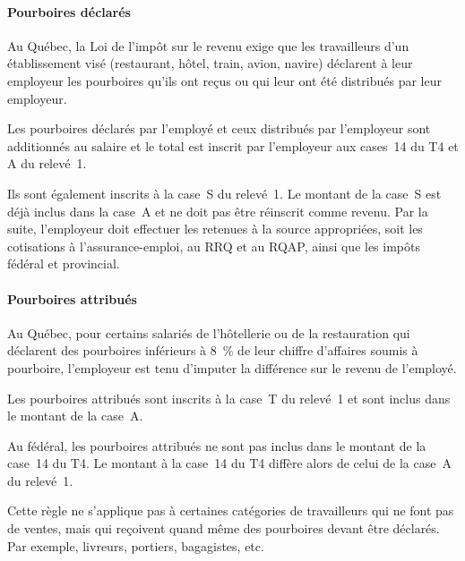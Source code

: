 \paragraph{Pourboires déclarés}
\qc
Au Québec, la Loi de l'impôt sur le revenu exige que les travailleurs d'un établissement visé (restaurant, hôtel, train, avion, navire) déclarent à leur employeur les pourboires qu'ils ont reçus ou qui leur ont été distribués par leur employeur.

Les pourboires déclarés par l'employé et ceux distribués par l'employeur sont additionnés au salaire et le total est inscrit par l'employeur aux cases~14 du T4 et A du relevé~1. 

Ils sont également inscrits à la case~S du relevé~1. Le montant de la case~S est déjà inclus dans la case~A et ne doit pas être réinscrit comme revenu. Par la suite, l'employeur doit effectuer les retenues à la source appropriées, soit les cotisations à l'assurance-emploi, au RRQ et au RQAP, ainsi que les impôts fédéral et provincial.

\paragraph{Pourboires attribués}

Au Québec, pour certains salariés de l'hôtellerie ou de la restauration qui déclarent des pourboires inférieurs à 8~\% de leur chiffre d'affaires soumis à pourboire, l'employeur est tenu d'imputer la différence sur le revenu de l'employé.

Les pourboires attribués sont inscrits à la case~T du relevé~1 et sont inclus dans le montant de la case~A.

Au fédéral, les pourboires attribués ne sont pas inclus dans le montant de la case~14 du T4. Le montant à la case~14 du T4 diffère alors de celui de la case~A du relevé~1.

Cette règle ne s'applique pas à certaines catégories de travailleurs qui ne font pas de ventes, mais qui reçoivent quand même des pourboires devant être déclarés. Par exemple, livreurs, portiers, bagagistes, etc.



